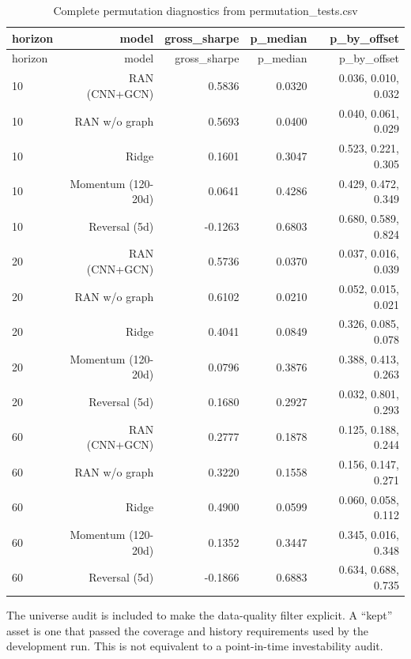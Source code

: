 \documentclass[10pt]{article}
\begin{document}
\begingroup\scriptsize\setlength{\tabcolsep}{3pt}
\begin{longtable}{lrrrr}
\caption{Complete permutation diagnostics from permutation\_tests.csv}\label{tab:permall}\\
\toprule
horizon & model & gross\_sharpe & p\_median & p\_by\_offset \\
\midrule
\endfirsthead
\toprule
horizon & model & gross\_sharpe & p\_median & p\_by\_offset \\
\midrule
\endhead
10 & RAN (CNN+GCN) & 0.5836 & 0.0320 & 0.036, 0.010, 0.032 \\
10 & RAN w/o graph & 0.5693 & 0.0400 & 0.040, 0.061, 0.029 \\
10 & Ridge & 0.1601 & 0.3047 & 0.523, 0.221, 0.305 \\
10 & Momentum (120-20d) & 0.0641 & 0.4286 & 0.429, 0.472, 0.349 \\
10 & Reversal (5d) & -0.1263 & 0.6803 & 0.680, 0.589, 0.824 \\
20 & RAN (CNN+GCN) & 0.5736 & 0.0370 & 0.037, 0.016, 0.039 \\
20 & RAN w/o graph & 0.6102 & 0.0210 & 0.052, 0.015, 0.021 \\
20 & Ridge & 0.4041 & 0.0849 & 0.326, 0.085, 0.078 \\
20 & Momentum (120-20d) & 0.0796 & 0.3876 & 0.388, 0.413, 0.263 \\
20 & Reversal (5d) & 0.1680 & 0.2927 & 0.032, 0.801, 0.293 \\
60 & RAN (CNN+GCN) & 0.2777 & 0.1878 & 0.125, 0.188, 0.244 \\
60 & RAN w/o graph & 0.3220 & 0.1558 & 0.156, 0.147, 0.271 \\
60 & Ridge & 0.4900 & 0.0599 & 0.060, 0.058, 0.112 \\
60 & Momentum (120-20d) & 0.1352 & 0.3447 & 0.345, 0.016, 0.348 \\
60 & Reversal (5d) & -0.1866 & 0.6883 & 0.634, 0.688, 0.735 \\
\bottomrule
\end{longtable}
\endgroup

The universe audit is included to make the data-quality filter explicit. A ``kept'' asset is one that passed the coverage and history requirements used by the development run. This is not equivalent to a point-in-time investability audit.
\end{document}
